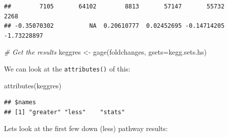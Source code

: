\documentclass[
]{article}
\newenvironment{Shaded}{\begin{snugshade}}{\end{snugshade}}
\newcommand{\AttributeTok}[1]{\textcolor[rgb]{0.77,0.63,0.00}{#1}}
\newcommand{\CommentTok}[1]{\textcolor[rgb]{0.56,0.35,0.01}{\textit{#1}}}
\newcommand{\FunctionTok}[1]{\textcolor[rgb]{0.00,0.00,0.00}{#1}}
\newcommand{\NormalTok}[1]{#1}
\newcommand{\OtherTok}[1]{\textcolor[rgb]{0.56,0.35,0.01}{#1}}
\newcommand{\SpecialCharTok}[1]{\textcolor[rgb]{0.00,0.00,0.00}{#1}}
\begin{document}
\begin{verbatim}
##        7105       64102        8813       57147       55732        2268 
## -0.35070302          NA  0.20610777  0.02452695 -0.14714205 -1.73228897
\end{verbatim}

\begin{Shaded}
\begin{Highlighting}[]
\CommentTok{\# Get the results}
\NormalTok{keggres }\OtherTok{\textless{}{-}} \FunctionTok{gage}\NormalTok{(foldchanges, }\AttributeTok{gsets=}\NormalTok{kegg.sets.hs)}
\end{Highlighting}
\end{Shaded}

We can look at the \texttt{attributes()} of this:

\begin{Shaded}
\begin{Highlighting}[]
\FunctionTok{attributes}\NormalTok{(keggres)}
\end{Highlighting}
\end{Shaded}

\begin{verbatim}
## $names
## [1] "greater" "less"    "stats"
\end{verbatim}

Lets look at the first few down (less) pathway results:

\begin{Shaded}
\end{Shaded}
\end{document}
